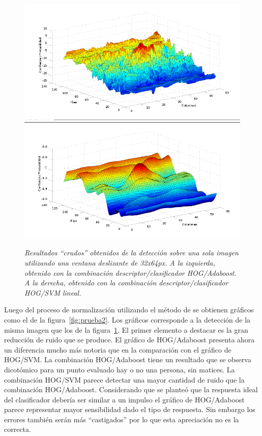 \begin{figure}[H]
  \centering
  \includegraphics[scale=.27]{images/raw/boost/prueba}
  \includegraphics[scale=.27]{images/raw/svm/prueba}
  \caption{\em Resultados ``crudos'' obtenidos de la detección sobre una sola imagen utilizando una ventana deslizante de 32x64px. A la izquierda, obtenido con la combinación descriptor/clasificador HOG/Adaboost. A la derecha, obtenido con la combinación descriptor/clasificador HOG/SVM lineal.}  
  \label{fig:prueba1}
\end{figure}

Luego del proceso de normalización utilizando el método de \cite{Platt1999} se obtienen gráficos como el de la figura~\ref{fig:prueba2}. Los gráficos corresponde a la detección de la misma imagen que los de la figura~\ref{fig:prueba1}. El primer elemento a destacar es la gran reducción de ruido que se produce. El gráfico de HOG/Adaboost presenta ahora un diferencia mucho más notoria que en la comparación con el gráfico de HOG/SVM. La combinación HOG/Adaboost tiene un resultado que se observa dicotómico \ie para un punto evaluado hay 
o no una persona, sin matices. La combinación HOG/SVM parece detectar una mayor cantidad de ruido que la combinación HOG/Adaboost. Considerando que se planteó que la respuesta ideal del clasificador debería ser similar a un impulso el gráfico de HOG/Adaboost parece representar mayor sensibilidad dado el tipo de respuesta. Sin embargo los errores también serán más ``castigados'' por lo que esta apreciación no es la correcta.

